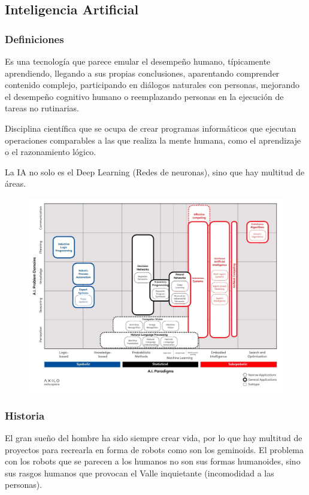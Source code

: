 \documentclass[12pt, twoside, openright]{report} %
\begin{document}
\subsection{Inteligencia Artificial}
\subsubsection{Definiciones}
Es una tecnología que parece emular el desempeño humano, típicamente aprendiendo, llegando a sus propias conclusiones, aparentando comprender contenido complejo, participando en diálogos naturales con personas, mejorando el desempeño cognitivo humano o reemplazando personas en la ejecución de tareas no rutinarias.

Disciplina científica que se ocupa de crear programas informáticos que ejecutan operaciones comparables a las que realiza la mente humana, como el aprendizaje o el razonamiento lógico.

La IA no solo es el Deep Learning (Redes de neuronas), sino que hay multitud de áreas.
\begin{figure}[H]
	{\includegraphics[scale=.23]{areas-ia.jpg}}
\end{figure}

\subsubsection{Historia}
El gran sueño del hombre ha sido siempre crear vida, por lo que hay multitud de proyectos para recrearla en forma de robots como son los geminoids. El problema con los robots que se parecen a los humanos no son sus formas humanoides, sino sus rasgos humanos que provocan el Valle inquietante (incomodidad a las personas).
\end{document}
